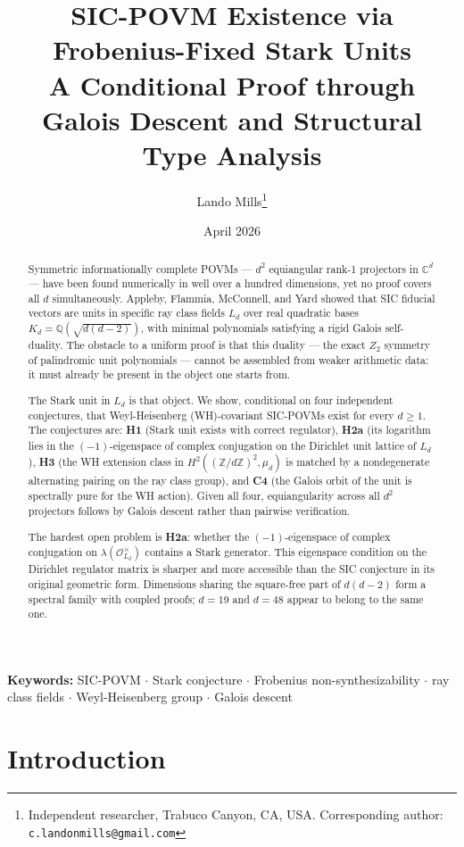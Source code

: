 \documentclass[12pt]{article}
\title{%
  \textbf{SIC-POVM Existence via Frobenius-Fixed Stark Units}\\[6pt]
  \large A Conditional Proof through Galois Descent and Structural Type Analysis
}
\author{Lando Mills\thanks{Independent researcher, Trabuco Canyon, CA, USA.
  Corresponding author: \texttt{c.landonmills@gmail.com}}}
\date{April 2026}
\theoremstyle{plain}
\theoremstyle{definition}
\theoremstyle{remark}
\newcommand{\OO}{\mathcal{O}}
\newcommand{\bQ}{\mathbb{Q}}
\newcommand{\bC}{\mathbb{C}}
\newcommand{\bZ}{\mathbb{Z}}
\begin{document}
\maketitle

\begin{abstract}
Symmetric informationally complete POVMs — $d^2$ equiangular rank-1 projectors in $\bC^d$ — have been found numerically in well over a hundred dimensions, yet no proof covers all $d$ simultaneously. Appleby, Flammia, McConnell, and Yard showed that SIC fiducial vectors are units in specific ray class fields $L_d$ over real quadratic bases $K_d = \bQ(\sqrt{d(d-2)})$, with minimal polynomials satisfying a rigid Galois self-duality. The obstacle to a uniform proof is that this duality — the exact $Z_2$ symmetry of palindromic unit polynomials — cannot be assembled from weaker arithmetic data: it must already be present in the object one starts from.

The Stark unit in $L_d$ is that object. We show, conditional on four independent conjectures, that Weyl-Heisenberg (WH)-covariant SIC-POVMs exist for every $d \geq 1$. The conjectures are: \textbf{H1} (Stark unit exists with correct regulator), \textbf{H2a} (its logarithm lies in the $(-1)$-eigenspace of complex conjugation on the Dirichlet unit lattice of $L_d$), \textbf{H3} (the WH extension class in $H^2((\bZ/d\bZ)^2, \mu_d)$ is matched by a nondegenerate alternating pairing on the ray class group), and \textbf{C4} (the Galois orbit of the unit is spectrally pure for the WH action). Given all four, equiangularity across all $d^2$ projectors follows by Galois descent rather than pairwise verification.

The hardest open problem is \textbf{H2a}: whether the $(-1)$-eigenspace of complex conjugation on $\lambda(\OO_{L_d}^\times)$ contains a Stark generator. This eigenspace condition on the Dirichlet regulator matrix is sharper and more accessible than the SIC conjecture in its original geometric form. Dimensions sharing the square-free part of $d(d-2)$ form a spectral family with coupled proofs; $d = 19$ and $d = 48$ appear to belong to the same one.
\end{abstract}

\noindent\textbf{Keywords:} SIC-POVM \(\cdot\) Stark conjecture \(\cdot\) Frobenius non-synthesizability \(\cdot\) ray class fields \(\cdot\) Weyl-Heisenberg group \(\cdot\) Galois descent

\tableofcontents

\section{Introduction}
\end{document}
